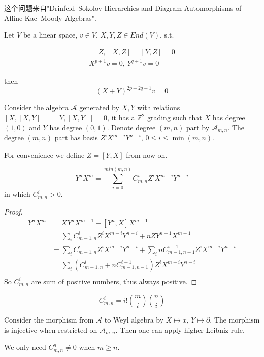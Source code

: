这个问题来自"Drinfeld–Sokolov Hierarchies and Diagram Automorphisms of Affine Kac–Moody Algebras".
\begin{conjecture}
Let $V$ be a linear space, $v\in V$, $X,Y,Z\in End(V)$, s.t.

\begin{align*}
    [X,Y]=Z,\,[X,Z]=[Y,Z]=0\\
    X^{p+1}v=0,\,Y^{q+1}v=0
\end{align*}

then $$(X+Y)^{2p+2q+1}v=0$$
\end{conjecture}

Consider the algebra $\mathcal{A}$ generated by $X,Y$ with relations $[X,[X,Y]]=[Y,[X,Y]]=0$, it has a $\mathbb{Z}^2$ grading such that $X$ has degree $(1,0)$ and $Y$ has degree $(0,1)$. Denote degree $(m,n)$ part by $\mathcal{A}_{m,n}$. The degree $(m,n)$ part has basis $Z^iX^{m-i}Y^{n-i}$, $0\le i\le\min(m,n)$.

For convenience we define $Z=[Y,X]$ from now on.

\begin{lemma}
$$Y^nX^m=\sum_{i=0}^{min(m,n)}C_{m,n}^{i}Z^iX^{m-i}Y^{n-i}$$
in which $C_{m,n}^{i}>0$.
\end{lemma}

\begin{proof}
\begin{align*}
    Y^nX^m&=XY^nX^{m-1}+[Y^n,X]X^{m-1}\\
    &=\sum_iC_{m-1,n}^{i}Z^iX^{m-i}Y^{n-i}+nZY^{n-1}X^{m-1}\\
    &=\sum_iC_{m-1,n}^{i}Z^iX^{m-i}Y^{n-i}+\sum_i nC_{m-1,n-1}^{i-1}Z^iX^{m-i}Y^{n-i}\\
    &=\sum_i(C_{m-1,n}^{i}+nC_{m-1,n-1}^{i-1})Z^iX^{m-i}Y^{n-i}\\
\end{align*}
So $C_{m,n}^{i}$ are sum of positive numbers, thus always positive.
\end{proof}

\begin{remark}
    $$C_{m,n}^{i}=i!\binom{m}{i}\binom{n}{i}$$
    
    Consider the morphism from $\mathcal{A}$ to Weyl algebra by $X \mapsto x$, $Y \mapsto \partial$. The morphism is injective when restricted on $\mathcal{A}_{m,n}$. Then one can apply higher Leibniz rule.
\end{remark}
\begin{remark}
We only need $C_{m,n}^{n}\not =0$ when $m\ge n$.
\end{remark}

